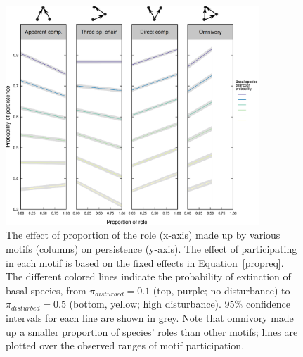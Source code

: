 \documentclass[12pt]{article}
\begin{document}
\begin{spacing}{2.0}
    \begin{figure}[hb!]
        \centering
        \includegraphics[width=0.85\textwidth]{figures/persistence_vs_motifs_labs.eps}
        \caption{The effect of proportion of the role (x-axis) made up by various motifs (columns) on persistence (y-axis). The effect of participating in each motif is based on the fixed effects in Equation~\ref{propreq}. The different colored lines indicate the probability of extinction of basal species, from $\pi_{disturbed} = 0.1$ (top, purple; no disturbance) to $\pi_{disturbed} = 0.5$ (bottom, yellow; high disturbance). 95\% confidence intervals for each line are shown in grey. Note that omnivory made up a smaller proportion of species' roles than other motifs; lines are plotted over the observed ranges of motif participation.}
    \label{fig:prop_lmer_all}
    \end{figure}
        


\end{spacing}
\end{document}
